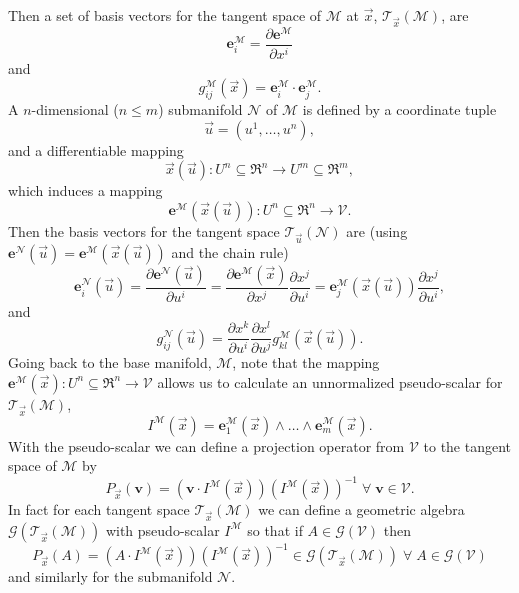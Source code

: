 \documentclass[12pt]{report}
\newcommand{\bm}[1]{\boldsymbol{#1}}
\newcommand{\bfrac}[2]{\displaystyle\frac{#1}{#2}}
\newcommand{\lp}{\left (}
\newcommand{\rp}{\right )}
\newcommand{\pdiff}[2]{\bfrac{\partial {#1}}{\partial {#2}}}
\newcommand{\W}{\wedge}
\newcommand{\f}[2]{{#1}\lp {#2} \rp}
\newcommand{\paren}[1]{\lp {#1} \rp}
\newcommand{\be}{\begin{equation}}
\newcommand{\ee}{\end{equation}}
\newcommand{\eb}{\bm{e}}
\newcommand{\Tn}[2]{\f{\mathcal{T}_{#2}}{#1}}
\begin{document}
Then a set of basis vectors for the tangent space of $\mathcal{M}$ at $\vec{x}$, $\Tn{\mathcal{M}}{\vec{x}}$, are
\be
    \bm{e}_{i}^{\mathcal{M}} = \pdiff{\bm{e}^{\mathcal{M}}}{x^{i}}
\ee
and
\be
    \f{g_{ij}^{\mathcal{M}}}{\vec{x}} = \bm{e}_{i}^{\mathcal{M}}\cdot\bm{e}_{j}^{\mathcal{M}}.
\ee
A $n$-dimensional ($n\le m$) submanifold $\mathcal{N}$ of $\mathcal{M}$ is defined by a coordinate tuple
\be
    \vec{u} = \paren{u^{1},\dots,u^{n}},
\ee
and a differentiable mapping
\be\label{eq_79}
    \f{\vec{x}}{\vec{u}}\colon U^{n}\subseteq\Re^{n}\rightarrow U^{m}\subseteq\Re^{m},
\ee
which induces a mapping
\be
    \f{\bm{e}^{\mathcal{M}}}{\f{\vec{x}}{\vec{u}}}\colon U^{n}\subseteq\Re^{n}\rightarrow \mathcal{V}.
\ee
Then the basis vectors for the tangent space $\Tn{\mathcal{N}}{\vec{u}}$ are
(using $\f{\eb^{\mathcal{N}}}{\vec{u}} = \f{\eb^{\mathcal{M}}}{\f{\vec{x}}{\vec{u}}}$ and the chain rule)
\be
    \f{\bm{e}_{i}^{\mathcal{N}}}{\vec{u}} = \pdiff{\f{\bm{e}^{\mathcal{N}}}{\vec{u}}}{u^{i}}
                                              = \pdiff{\f{\bm{e}^{\mathcal{M}}}{\vec{x}}}{x^{j}}\pdiff{x^{j}}{u^{i}}
                                              = \f{\bm{e}_{j}^{\mathcal{M}}}{\f{\vec{x}}{\vec{u}}}\pdiff{x^{j}}{u^{i}},
\ee
and
\be\label{eq_81}
    \f{g_{ij}^{\mathcal{N}}}{\vec{u}} = \pdiff{x^{k}}{u^{i}}\pdiff{x^{l}}{u^{j}}
                                            \f{g_{kl}^{\mathcal{M}}}{\f{\vec{x}}{\vec{u}}}.
\ee
Going back to the base manifold, $\mathcal{M}$, note that the mapping
$\f{\bm{e}^{\mathcal{M}}}{\vec{x}}\colon U^{n}\subseteq\Re^{n}\rightarrow \mathcal{V}$ allows us to calculate an unnormalized pseudo-scalar
for $\Tn{\mathcal{M}}{\vec{x}}$,
\be
    \f{I^{\mathcal{M}}}{\vec{x}} = \f{\bm{e}_{1}^{\mathcal{M}}}{\vec{x}}
                                       \W\dots\W\f{\bm{e}_{m}^{\mathcal{M}}}{\vec{x}}.
\ee
With the pseudo-scalar we can define a projection operator from $\mathcal{V}$
to the tangent space of $\mathcal{M}$ by
\be
    \f{P_{\vec{x}}}{\bm{v}} = (\bm{v}\cdot \f{I^{\mathcal{M}}}{\vec{x}})
                              \paren{\f{I^{\mathcal{M}}}{\vec{x}}}^{-1} \;\forall\; \bm{v}\in\mathcal{V}.
\ee
In fact for each tangent space $\Tn{\mathcal{M}}{\vec{x}}$ we can define a geometric algebra
$\f{\mathcal{G}}{\Tn{\mathcal{M}}{\vec{x}}}$ with pseudo-scalar $I^{\mathcal{M}}$ so that if
$A \in \f{\mathcal{G}}{\mathcal{V}}$ then
\be
    \f{P_{\vec{x}}}{A} = \paren{A\cdot \f{I^{\mathcal{M}}}{\vec{x}}}
                         \paren{\f{I^{\mathcal{M}}}{\vec{x}}}^{-1}
                         \in \f{\mathcal{G}}{\Tn{\mathcal{M}}{\vec{x}}}\;\forall\;
                         A \in \f{\mathcal{G}}{\mathcal{V}}
\ee
and similarly for the submanifold $\mathcal{N}$.
\end{document}

